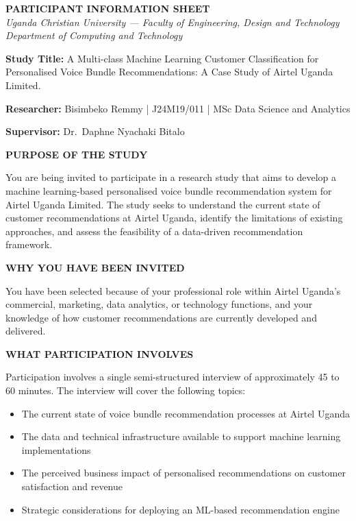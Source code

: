 \begin{center}
\textbf{PARTICIPANT INFORMATION SHEET}\\[0.3cm]
\textit{Uganda Christian University --- Faculty of Engineering, Design and Technology}\\
\textit{Department of Computing and Technology}
\end{center}

\vspace{0.3cm}
\textbf{Study Title:} A Multi-class Machine Learning Customer Classification for Personalised Voice Bundle Recommendations: A Case Study of Airtel Uganda Limited.

\textbf{Researcher:} Bisimbeko Remmy | J24M19/011 | MSc Data Science and Analytics

\textbf{Supervisor:} Dr.\ Daphne Nyachaki Bitalo

\vspace{0.3cm}
\textbf{PURPOSE OF THE STUDY}

You are being invited to participate in a research study that aims to develop a machine learning-based personalised voice bundle recommendation system for Airtel Uganda Limited. The study seeks to understand the current state of customer recommendations at Airtel Uganda, identify the limitations of existing approaches, and assess the feasibility of a data-driven recommendation framework.

\vspace{0.3cm}
\textbf{WHY YOU HAVE BEEN INVITED}

You have been selected because of your professional role within Airtel Uganda's commercial, marketing, data analytics, or technology functions, and your knowledge of how customer recommendations are currently developed and delivered.

\vspace{0.3cm}
\textbf{WHAT PARTICIPATION INVOLVES}

Participation involves a single semi-structured interview of approximately 45 to 60 minutes. The interview will cover the following topics:
\begin{itemize}
    \item The current state of voice bundle recommendation processes at Airtel Uganda
    \item The data and technical infrastructure available to support machine learning implementations
    \item The perceived business impact of personalised recommendations on customer satisfaction and revenue
    \item Strategic considerations for deploying an ML-based recommendation engine
\end{itemize}

